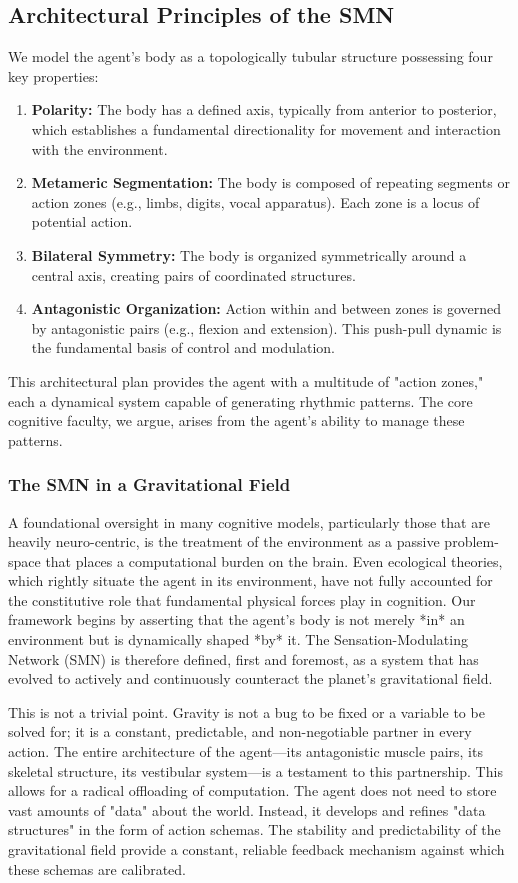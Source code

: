 \subsection*{Architectural Principles of the SMN}
We model the agent's body as a topologically tubular structure possessing four key properties:
\begin{enumerate}
    \item \textbf{Polarity:} The body has a defined axis, typically from anterior to posterior, which establishes a fundamental directionality for movement and interaction with the environment.
    \item \textbf{Metameric Segmentation:} The body is composed of repeating segments or action zones (e.g., limbs, digits, vocal apparatus). Each zone is a locus of potential action.
    \item \textbf{Bilateral Symmetry:} The body is organized symmetrically around a central axis, creating pairs of coordinated structures.
    \item \textbf{Antagonistic Organization:} Action within and between zones is governed by antagonistic pairs (e.g., flexion and extension). This push-pull dynamic is the fundamental basis of control and modulation.
\end{enumerate}
This architectural plan provides the agent with a multitude of "action zones," each a dynamical system capable of generating rhythmic patterns. The core cognitive faculty, we argue, arises from the agent's ability to manage these patterns.

\subsubsection*{The SMN in a Gravitational Field}
A foundational oversight in many cognitive models, particularly those that are heavily neuro-centric, is the treatment of the environment as a passive problem-space that places a computational burden on the brain. Even ecological theories, which rightly situate the agent in its environment, have not fully accounted for the constitutive role that fundamental physical forces play in cognition. Our framework begins by asserting that the agent’s body is not merely *in* an environment but is dynamically shaped *by* it. The Sensation-Modulating Network (SMN) is therefore defined, first and foremost, as a system that has evolved to actively and continuously counteract the planet's gravitational field.

This is not a trivial point. Gravity is not a bug to be fixed or a variable to be solved for; it is a constant, predictable, and non-negotiable partner in every action. The entire architecture of the agent—its antagonistic muscle pairs, its skeletal structure, its vestibular system—is a testament to this partnership. This allows for a radical offloading of computation. The agent does not need to store vast amounts of "data" about the world. Instead, it develops and refines "data structures" in the form of action schemas. The stability and predictability of the gravitational field provide a constant, reliable feedback mechanism against which these schemas are calibrated.


